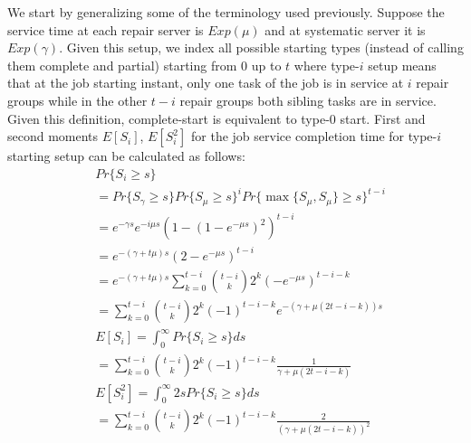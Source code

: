 \documentclass[sigconf,draft]{acmart}
\begin{document}
We start by generalizing some of the terminology used previously. Suppose the service time at each repair server is $Exp(\mu)$ and at systematic server it is $Exp(\gamma)$. Given this setup, we index all possible starting types (instead of calling them complete and partial) starting from $0$ up to $t$ where type-$i$ setup means that at the job starting instant, only one task of the job is in service at $i$ repair groups while in the other $t-i$ repair groups both sibling tasks are in service. Given this definition, complete-start is equivalent to type-$0$ start. First and second moments $E[S_i]$, $E[S_i^2]$ for the job service completion time for type-$i$ starting setup can be calculated as follows:
\begin{equation}
\label{eq:eq_job_starting_setup_moments}
  \begin{split}
    & Pr\{S_i \geq s\} \\
    &= Pr\{S_{\gamma} \geq s\}Pr\{S_{\mu} \geq s\}^i Pr\{\max\{S_{\mu}, S_{\mu}\} \geq s\}^{t-i} \\
    &= e^{-\gamma s}e^{-i\mu s}(1-(1-e^{-\mu s})^2)^{t-i} \\
    &= e^{-(\gamma+t\mu)s}(2-e^{-\mu s})^{t-i} \\
    &= e^{-(\gamma+t\mu)s} \sum\limits_{k=0}^{t-i} {{t-i}\choose{k}} 2^k (-e^{-\mu s})^{t-i-k} \\
    &= \sum\limits_{k=0}^{t-i} {{t-i}\choose{k}} 2^k (-1)^{t-i-k} e^{-(\gamma+\mu(2t-i-k))s} \\
    & E[S_i] = \int_{0}^{\infty} Pr\{S_i \geq s\} ds \\
    &= \sum\limits_{k=0}^{t-i} {{t-i}\choose{k}} 2^k (-1)^{t-i-k} \frac{1}{\gamma+\mu(2t-i-k)} \\
    & E[S_i^2] = \int_{0}^{\infty} 2s Pr\{S_i \geq s\} ds \\
    &= \sum\limits_{k=0}^{t-i} {{t-i}\choose{k}} 2^k (-1)^{t-i-k} \frac{2}{(\gamma+\mu(2t-i-k ))^2}
  \end{split}
\end{equation}
\end{document}
